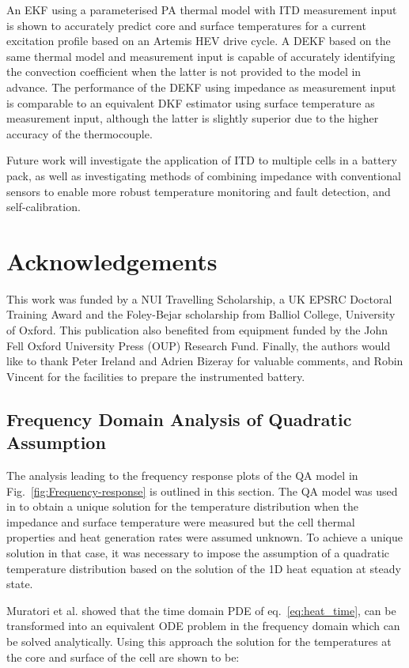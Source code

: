 \documentclass[journal, english]{IEEEtran}
\begin{document}
An EKF using a parameterised PA thermal model with ITD measurement
input is shown to accurately predict core and surface temperatures
for a current excitation profile based on an Artemis HEV drive cycle.
A DEKF based on the same thermal model and measurement input is capable
of accurately identifying the convection coefficient when the latter
is not provided to the model in advance. The performance of the DEKF
using impedance as measurement input is comparable to an equivalent
DKF estimator using surface temperature as measurement input, although
the latter is slightly superior due to the higher accuracy of the thermocouple.

Future work will investigate the application of ITD to multiple cells
in a battery pack, as well as investigating methods of combining impedance
with conventional sensors to enable more robust temperature monitoring
and fault detection, and self-calibration.

\section*{Acknowledgements}
This work was funded by a NUI Travelling
Scholarship, a UK EPSRC Doctoral Training Award and the Foley-Bejar scholarship from Balliol
College, University of Oxford. This publication also benefited from
equipment funded by the John Fell Oxford University Press (OUP) Research
Fund.
Finally, the authors would like to thank Peter Ireland and Adrien Bizeray for valuable comments, and Robin Vincent for the facilities to prepare the instrumented battery.



\appendix{} \subsection{Frequency Domain Analysis of Quadratic Assumption\label{sub:Frequency-domain-analysis}}
The analysis leading to the frequency response plots
of the QA model in Fig.\ \ref{fig:Frequency-response} is outlined in this section. 
The QA model was used in \cite{Richardson2014} to obtain a unique solution for the temperature distribution when the impedance and surface temperature were measured but the cell thermal properties and heat generation rates were assumed unknown. To achieve a unique solution in that case, it was necessary to impose the assumption of a quadratic temperature distribution based on the solution of the 1D heat equation at steady state.

Muratori et al. \cite{Muratori2010a} showed that the time domain PDE of
eq.\ \ref{eq:heat_time}, can be transformed into an equivalent ODE
problem in the frequency domain which can be solved analytically.
Using this approach the solution for the temperatures at the core and surface of the cell are shown to be:
\end{document}
